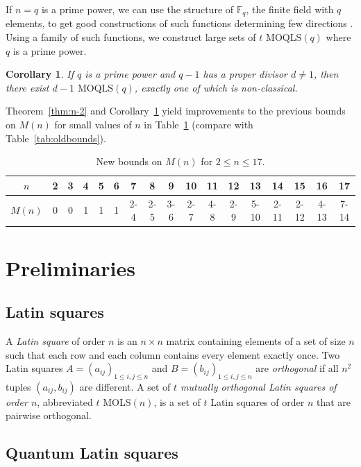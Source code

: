 \documentclass[a4paper]{article}
\newtheorem{corollary}[theorem]{Corollary}
\theoremstyle{definition}
\newcommand{\FF}{\mathbb F}
\newcommand{\MOQLS}[1]{\(\mathrm{MOQLS}(#1)\)}
\begin{document}
If \(n=q\) is a prime power, we can use the structure of \(\FF_q\), the finite field with \(q\) elements, to get good constructions of such functions determining few directions \cite{BBS,LS1981}. Using a family of such functions, we construct large sets of \(t\) \MOQLS{q} where \(q\) is a prime power.

\begin{corollary}\label{cor:construction}
    If \(q\) is a prime power and \(q-1\) has a proper divisor \(d\neq1\), then there exist \(d-1\) \MOQLS{q}, exactly one of which is non-classical.
\end{corollary}

Theorem~\ref{thm:n-2} and Corollary~\ref{cor:construction} yield improvements to the previous bounds on \(M(n)\) for small values of \(n\) in Table~\ref{tab:newbounds} (compare with Table~\ref{tab:oldbounds}).

\begin{table}[H]
    \centering
    \begin{tabular}{c|cccccccccccccccc}
\(n\) & 2 & 3 & 4 & 5 & 6 & 7 & 8 & 9 & 10 & 11 & 12 & 13 & 14 & 15 & 16 & 17\\
\hline
\(M(n)\) & 0 & 0 & 1 & 1 & 1 & 2-4 & 2-5 & 3-6 & 2-7 & 4-8 & 2-9 & 5-10 & 2-11 & 2-12 & 4-13 & 7-14
\end{tabular}
\caption{New bounds on \(M(n)\) for \(2\leq n\leq17\).}
    \label{tab:newbounds}
\end{table}

\section{Preliminaries}\label{sec:prelim}

\subsection{Latin squares}

A \emph{Latin square} of order \(n\) is an \(n\times n\) matrix containing elements of a set of size \(n\) such that each row and each column contains every element exactly once.
Two Latin squares \(A=\left(a_{ij}\right)_{1\leq i,j\leq n}\) and \(B=\left(b_{ij}\right)_{1\leq i,j\leq n}\) are \emph{orthogonal} if all \(n^2\) tuples \((a_{ij},b_{ij})\) are different.
A set of \emph{\(t\) mutually orthogonal Latin squares of order \(n\)}, abbreviated \(t\) MOLS\((n)\), is a set of \(t\) Latin squares of order \(n\) that are pairwise orthogonal.

\subsection{Quantum Latin squares}
\end{document}
